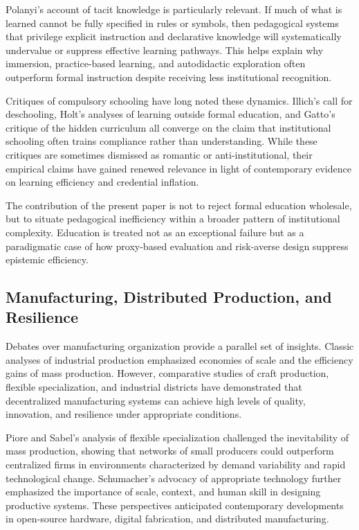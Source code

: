 \documentclass[11pt]{article}
\begin{document}
Polanyi’s account of tacit knowledge is particularly relevant. If much of what is learned cannot be fully specified in rules or symbols, then pedagogical systems that privilege explicit instruction and declarative knowledge will systematically undervalue or suppress effective learning pathways. This helps explain why immersion, practice-based learning, and autodidactic exploration often outperform formal instruction despite receiving less institutional recognition.

Critiques of compulsory schooling have long noted these dynamics. Illich’s call for deschooling, Holt’s analyses of learning outside formal education, and Gatto’s critique of the hidden curriculum all converge on the claim that institutional schooling often trains compliance rather than understanding. While these critiques are sometimes dismissed as romantic or anti-institutional, their empirical claims have gained renewed relevance in light of contemporary evidence on learning efficiency and credential inflation.

The contribution of the present paper is not to reject formal education wholesale, but to situate pedagogical inefficiency within a broader pattern of institutional complexity. Education is treated not as an exceptional failure but as a paradigmatic case of how proxy-based evaluation and risk-averse design suppress epistemic efficiency.

\subsection{Manufacturing, Distributed Production, and Resilience}

Debates over manufacturing organization provide a parallel set of insights. Classic analyses of industrial production emphasized economies of scale and the efficiency gains of mass production. However, comparative studies of craft production, flexible specialization, and industrial districts have demonstrated that decentralized manufacturing systems can achieve high levels of quality, innovation, and resilience under appropriate conditions.

Piore and Sabel’s analysis of flexible specialization challenged the inevitability of mass production, showing that networks of small producers could outperform centralized firms in environments characterized by demand variability and rapid technological change. Schumacher’s advocacy of appropriate technology further emphasized the importance of scale, context, and human skill in designing productive systems. These perspectives anticipated contemporary developments in open-source hardware, digital fabrication, and distributed manufacturing.
\end{document}
